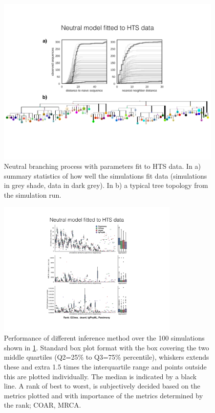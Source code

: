 \begin{figure}[!ht]
    \centering
    \includegraphics[width=1\textwidth]{figures/Laura-neutsim_runstat.pdf}
    \caption{
        \label{fig:Laura-neutsim_runstat}
        Neutral branching process with parameters fit to HTS data. In a) summary statistics of how well the simulations fit data (simulations in grey shade, data in dark grey). In b) a typical tree topology from the simulation run.
    }
\end{figure}
\begin{figure}
    \centering
    \includegraphics[width=0.8\textwidth]{figures/Laura-neutsim_vali.pdf}
    \caption{
        \label{fig:Laura-neutsim_vali}
        Performance of different inference method over the 100 simulations shown in \ref{fig:Laura-neutsim_runstat}.
        Standard box plot format with the box covering the two middle quartiles (Q2=25\% to Q3=75\% percentile), whiskers extends these and extra 1.5 times the interquartile range and points outside this are plotted individually.
        The median is indicated by a black line.
        A rank of best to worst, is subjectively decided based on the metrics plotted and with importance of the metrics determined by the rank; COAR, MRCA.
    }
\end{figure}




